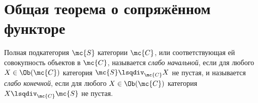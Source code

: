 \documentclass[
	extrafontsizes,
	11pt,
	hyphens,
]{memoir}
\begin{document}
%
%
%


\section{Общая теорема о сопряжённом функторе}


\begin{definition}
Полная подкатегория \(\mc{S}\) категории \(\mc{C}\), или соответствующая ей совокупность объектов в \(\mc{C}\), называется \emph{слабо начальной},
если для любого \(X \in \Ob(\mc{C})\) категория \(\mc{S} \lsqdiv_{\mc{C}} X\) не пустая,
и называется \emph{слабо конечной},
если для любого \(X \in \Ob(\mc{C})\) категория \(X \lsqdiv_{\mc{C}} \mc{S}\) не пустая.
\end{definition}


\end{document}
